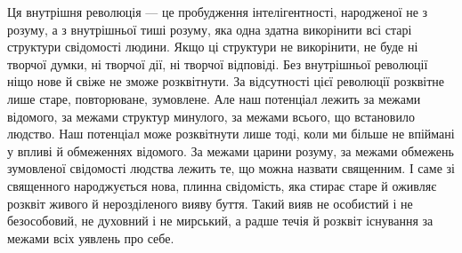 Ця внутрішня революція — це пробудження інтелігентності, народженої не з розуму, а з внутрішньої тиші розуму, яка одна здатна викорінити всі старі структури свідомості людини. Якщо ці структури не викорінити, не буде ні творчої думки, ні творчої дії, ні творчої відповіді. Без внутрішньої революції ніщо нове й свіже не зможе розквітнути. За відсутності цієї революції розквітне лише старе, повторюване, зумовлене. Але наш потенціал лежить за межами відомого, за межами структур минулого, за межами всього, що встановило людство. Наш потенціал може розквітнути лише тоді, коли ми більше не впіймані у впливі й обмеженнях відомого. За межами царини розуму, за межами обмежень зумовленої свідомості людства лежить те, що можна назвати священним. І саме зі священного народжується нова, плинна свідомість, яка стирає старе й оживляє розквіт живого й нерозділеного вияву буття. Такий вияв не особистий і не безособовий, не духовний і не мирський, а радше течія й розквіт існування за межами всіх уявлень про себе.
